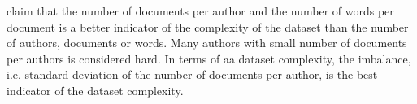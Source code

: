 \citet{tyo_state_2022} claim that the number of documents per author and the number of words per document is 
a better indicator of the complexity of the dataset than the number of authors, documents or words.
Many authors with small number of documents per authors is considered hard.
In terms of \ac{aa} dataset complexity, the imbalance, i.e. standard deviation of the number of documents per author, 
is the best indicator of the dataset complexity.
